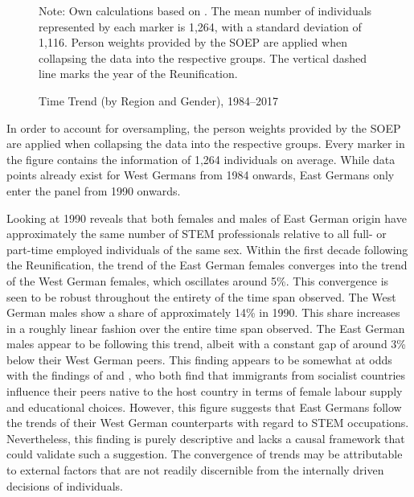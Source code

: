 \documentclass[a4paper, oneside, hyperfootnotes = false]{article}
\begin{document}
{\begin{figure}[ht]
	\centering
	\caption{Time Trend (by Region and Gender), 1984--2017}
	\label{fig:timetrend}
	\fontsize{9pt}{11pt}\selectfont
	\def\svgwidth{.9\textwidth}
	
	\vspace{2mm}
	\parbox{10cm}{
		\linespread{1}\footnotesize Note: Own calculations based on \cite{SOEP2023}. The mean number of individuals represented by each marker is 1,264, with a standard deviation of 1,116. Person weights provided by the SOEP are applied when collapsing the data into the respective groups. The vertical dashed line marks the year of the Reunification.}
\end{figure}

In order to account for oversampling, the person weights provided by the SOEP are applied when collapsing the data into the respective groups.
Every marker in the figure contains the information of 1,264 individuals on average.
While data points already exist for West Germans from 1984 onwards, East Germans only enter the panel from 1990 onwards.

Looking at 1990 reveals that both females and males of East German origin have approximately the same number of STEM professionals relative to all full- or part-time employed individuals of the same sex.
Within the first decade following the Reunification, the trend of the East German females converges into the trend of the West German females, which oscillates around 5\%.
This convergence is seen to be robust throughout the entirety of the time span observed.
The West German males show a share of approximately 14\% in 1990.
This share increases in a roughly linear fashion over the entire time span observed.
The East German males appear to be following this trend, albeit with a constant gap of around 3\% below their West German peers.
This finding appears to be somewhat at odds with the findings of \cite{Jessen2023} and \cite{FriedmanSokuler2020}, who both find that immigrants from socialist countries influence their peers native to the host country in terms of female labour supply and educational choices.
However, this figure suggests that East Germans follow the trends of their West German counterparts with regard to STEM occupations.
Nevertheless, this finding is purely descriptive and lacks a causal framework that could validate such a suggestion.
The convergence of trends may be attributable to external factors that are not readily discernible from the internally driven decisions of individuals.

}
\end{document}
